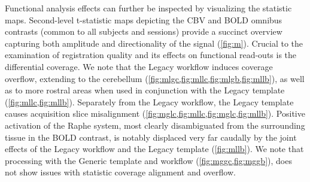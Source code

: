 Functional analysis effects can further be inspected by visualizing the statistic maps.
Second-level t-statistic maps depicting the CBV and BOLD omnibus contrasts (common to all subjects and sessions) provide a succinct overview capturing both amplitude and directionality of the signal (\cref{fig:m}).
Crucial to the examination of registration quality and its effects on functional read-outs is the differential coverage.
We note that the Legacy workflow induces coverage overflow, extending to the cerebellum (\cref{fig:mlgc,fig:mllc,fig:mlgb,fig:mllb}), as well as to more rostral areas when used in conjunction with the Legacy template (\cref{fig:mllc,fig:mllb}).
Separately from the Legacy workflow, the Legacy template causes acquisition slice misalignment (\cref{fig:mglc,fig:mllc,fig:mglc,fig:mllb}).
Positive activation of the Raphe system, most clearly disambiguated from the surrounding tissue in the BOLD contrast, is notably displaced very far caudally by the joint effects of the Legacy workflow and the Legacy template (\cref{fig:mllb}).
We note that processing with the Generic template and workflow (\cref{fig:mggc,fig:mggb}), does not show issues with statistic coverage alignment and overflow.


